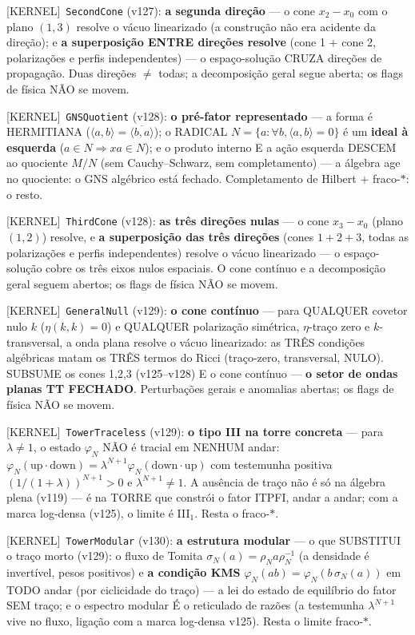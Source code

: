 \documentclass[11pt]{article}
\providecommand{\kernelmk}[1]{\textsf{[KERNEL]}~\texttt{#1}}\providecommand{\knownmk}[1]{\textsf{[KNOWN]}~{#1}}\providecommand{\statusmk}[1]{\textsf{[#1]}}
\theoremstyle{definition}\newtheorem{deriv}{Derivação}
\begin{document}
\kernelmk{SecondCone} (v127): \textbf{a segunda direção} --- o cone $x_2{-}x_0$ com o plano $(1,3)$ resolve o vácuo linearizado (a construção não era acidente da direção); e \textbf{a superposição ENTRE direções resolve} (cone 1 $+$ cone 2, polarizações e perfis independentes) --- o espaço-solução CRUZA direções de propagação. Duas direções $\neq$ todas; a decomposição geral segue aberta; os flags de física NÃO se movem.

\kernelmk{GNSQuotient} (v128): \textbf{o pré-fator representado} --- a forma é HERMITIANA ($\langle a,b\rangle=\overline{\langle b,a\rangle}$); o RADICAL $N=\{a:\forall b,\langle a,b\rangle=0\}$ é um \textbf{ideal à esquerda} ($a\in N\Rightarrow x a\in N$); e o produto interno E a ação esquerda DESCEM ao quociente $M/N$ (sem Cauchy--Schwarz, sem completamento) --- a álgebra age no quociente: o GNS algébrico está fechado. Completamento de Hilbert $+$ fraco-$*$: o resto.

\kernelmk{ThirdCone} (v128): \textbf{as três direções nulas} --- o cone $x_3{-}x_0$ (plano $(1,2)$) resolve, e \textbf{a superposição das três direções} (cones $1{+}2{+}3$, todas as polarizações e perfis independentes) resolve o vácuo linearizado --- o espaço-solução cobre os três eixos nulos espaciais. O cone contínuo e a decomposição geral seguem abertos; os flags de física NÃO se movem.

\kernelmk{GeneralNull} (v129): \textbf{o cone contínuo} --- para QUALQUER covetor nulo $k$ ($\eta(k,k)=0$) e QUALQUER polarização simétrica, $\eta$-traço zero e $k$-transversal, a onda plana resolve o vácuo linearizado: as TRÊS condições algébricas matam os TRÊS termos do Ricci (traço-zero, transversal, NULO). SUBSUME os cones 1,2,3 (v125--v128) E o cone contínuo --- \textbf{o setor de ondas planas TT FECHADO}. Perturbações gerais e anomalias abertas; os flags de física NÃO se movem.

\kernelmk{TowerTraceless} (v129): \textbf{o tipo III na torre concreta} --- para $\lambda\neq1$, o estado $\varphi_N$ NÃO é tracial em NENHUM andar: $\varphi_N(\text{up}\cdot\text{down})=\lambda^{N+1}\varphi_N(\text{down}\cdot\text{up})$ com testemunha positiva $(1/(1{+}\lambda))^{N+1}>0$ e $\lambda^{N+1}\neq1$. A ausência de traço não é só na álgebra plena (v119) --- é na TORRE que constrói o fator ITPFI, andar a andar; com a marca log-densa (v125), o limite é III$_1$. Resta o fraco-$*$.

\kernelmk{TowerModular} (v130): \textbf{a estrutura modular} --- o que SUBSTITUI o traço morto (v129): o fluxo de Tomita $\sigma_N(a)=\rho_N a\rho_N^{-1}$ (a densidade é invertível, pesos positivos) e \textbf{a condição KMS} $\varphi_N(ab)=\varphi_N(b\,\sigma_N(a))$ em TODO andar (por ciclicidade do traço) --- a lei do estado de equilíbrio do fator SEM traço; e o espectro modular É o reticulado de razões (a testemunha $\lambda^{N+1}$ vive no fluxo, ligação com a marca log-densa v125). Resta o limite fraco-$*$.
\end{document}
